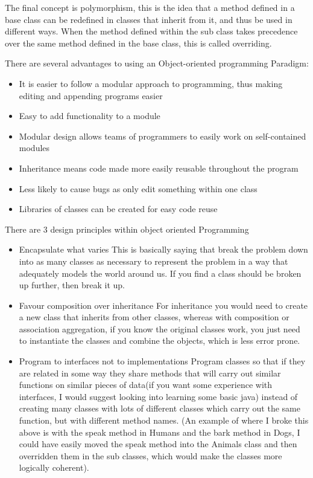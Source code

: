   	The final concept is polymorphism, this is the idea that a method defined in a base class can be redefined in classes that inherit from it, and thus be used in different ways. When the method defined within the sub class takes precedence over the same method defined in the base class, this is called overriding.
  	
  	There are several advantages to using an Object-oriented programming Paradigm:
  	\begin{itemize}
  		\item It is easier to follow a modular approach to programming, thus making editing and appending programs easier
  		\item Easy to add functionality to a module
  		\item Modular design allows teams of programmers to easily work on self-contained modules
  		\item Inheritance means code made more easily reusable throughout the program
  		\item Less likely to cause bugs as only edit something within one class
  		\item Libraries of classes can be created for easy code reuse
  	\end{itemize}
  	
  	There are 3 design principles within object oriented Programming
  	\begin{itemize}
  		\item Encapsulate what varies
  		\subitem This is basically saying that break the problem down into as many classes as necessary to represent the problem in a way that adequately models the world around us. If you find a class should be broken up further, then break it up.
  		\item Favour composition over inheritance
  		\subitem For inheritance you would need to create a new class that inherits from other classes, whereas with composition or association aggregation, if you know the original classes work, you just need to instantiate the classes and combine the objects, which is less error prone.
  		\item Program to interfaces not to implementations
  		\subitem Program classes so that if they are related in some way they share methods that will carry out similar functions on similar pieces of data(if you want some experience with interfaces, I would suggest looking into learning some basic java) instead of creating many classes with lots of different classes which carry out the same function, but with different method names. (An example of where I broke this above is with the speak method in Humans and the bark method in Dogs, I could have easily moved the speak method into the Animals class and then overridden them in the sub classes, which would make the classes more logically coherent).
  	\end{itemize}
  	
